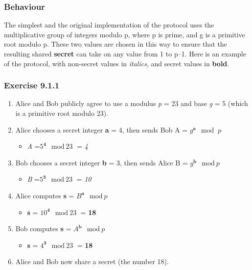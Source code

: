 \documentclass{article}
\begin{document}
\subsubsection{Behaviour}
The simplest and the original implementation of the protocol uses the multiplicative group of integers modulo p, where p is prime, and g is a primitive root modulo p. These two values are chosen in this way to ensure that the resulting shared \textbf{secret} can take on any value from 1 to p–1. Here is an example of the protocol, with non-secret values in \textit{italics}, and secret values in \textbf{bold}.
\subsubsection{Exercise 9.1.1}

\begin{enumerate}
\item Alice and Bob publicly agree to use a modulus \textit{p} = 23 and base \textit{g} = 5 (which is a primitive root modulo 23).
\item Alice chooses a secret integer \textbf{a} = 4, then sends Bob A = $\textit{g}^\textbf{a} \mod\textit{ p}$

\begin{itemize}
\item \textit{A} =$ \textit{5}^\textbf{4} \mod \textit{23}$ = \textit{4}

\end{itemize}
\item Bob chooses a secret integer \textbf{b} = 3, then sends Alice B = $\textit{g}^\textbf{b} \mod \textit{p}$
\begin{itemize}
\item \textit{B} =$ \textit{5}^\textbf{3} \mod \textit{23}$ = \textit{10}
\end{itemize}
\item Alice computes \textbf{s} = $\textit{B}^\textbf{a} \mod \textit{p}$
\begin{itemize}
\item \textbf{s} = $\textit{10}^\textbf{4} \mod \textit{23}$ = \textbf{18}
\end{itemize}
\item Bob computes \textbf{s} = $\textit{A}^\textbf{b} \mod \textit{p}$
\begin{itemize}
\item \textbf{s} =  $\textit{4}^\textbf{3}  \mod \textit{23}$ = \textbf{18}
\end{itemize}
\item Alice and Bob now share a secret (the number 18).\\


\end{enumerate}
\end{document}
